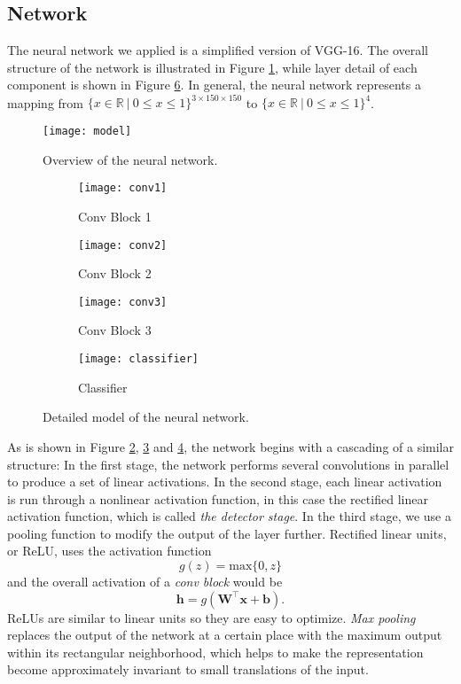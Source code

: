 \subsection{Network}
The neural network we applied is a simplified version of VGG-16\cite{simonyan2014very}. The overall structure of the network is illustrated in Figure \ref{fig:overview}, while layer detail of each component is shown in Figure \ref{fig:model}. In general, the neural network represents a mapping from $\{x\in\mathbb{R}~|~0\leq x \leq 1\}^{3\times150\times150}$ to $\{x\in\mathbb{R}~|~0\leq x \leq 1\}^4$.

\begin{figure}[htbp]
    \centering
    \texttt{[image: model]}
    \caption{Overview of the neural network.}
    \label{fig:overview}
\end{figure}

\begin{figure}[htbp]
    \begin{subfigure}[b]{0.24\textwidth}
        \texttt{[image: conv1]}
        \caption{Conv Block 1}
        \label{fig:conv1}
    \end{subfigure}
    \begin{subfigure}[b]{0.24\textwidth}
        \texttt{[image: conv2]}
        \caption{Conv Block 2}
        \label{fig:conv2}
    \end{subfigure}
    \begin{subfigure}[b]{0.24\textwidth}
        \texttt{[image: conv3]}
        \caption{Conv Block 3}
        \label{fig:conv3}
    \end{subfigure}
    \begin{subfigure}[b]{0.24\textwidth}
        \texttt{[image: classifier]}
        \caption{Classifier}
        \label{fig:classifier}
    \end{subfigure}
\caption{Detailed model of the neural network.}
\label{fig:model}
\end{figure}

As is shown in Figure \ref{fig:conv1}, \ref{fig:conv2} and \ref{fig:conv3}, the network begins with a cascading of a similar structure: In the first stage, the network performs several convolutions in parallel to produce a set of linear activations. In the second stage, each linear activation is run through a nonlinear activation function, in this case the rectified linear activation function, which is called \emph{the detector stage}. In the third stage, we use a pooling function to modify the output of the layer further\cite{dlbook}. Rectified linear units, or ReLU, uses the activation function
\[
  g(z)=\mathrm{max}\{0,z\}
\]
and the overall activation of a \emph{conv block} would be
\[
  \boldsymbol{h} = g(\boldsymbol{W}^\top \boldsymbol{x} + \boldsymbol{b})\textrm{.}
\]
ReLUs are similar to linear units so they are easy to optimize. \emph{Max pooling}\cite{zhou1988computation} replaces the output of the network at a certain place with the maximum output within its rectangular neighborhood, which helps to make the representation become approximately invariant to small translations of the input\cite{dlbook}.

